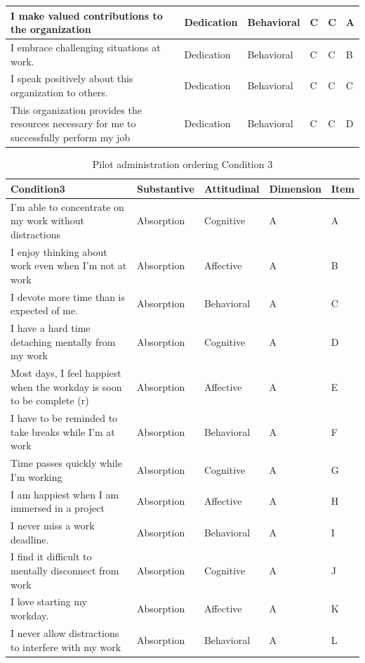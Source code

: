 \documentclass[
]{book}
\begin{document}
\begin{table}
\begin{tabular}[t]{l|l|l|l|l|l}
\hline
I make valued contributions to the organization & Dedication & Behavioral & C & C & A\\
\hline
I embrace challenging situations at work. & Dedication & Behavioral & C & C & B\\
\hline
I speak positively about this organization to others. & Dedication & Behavioral & C & C & C\\
\hline
This organization provides the resources necessary for me to successfully perform my job & Dedication & Behavioral & C & C & D\\
\hline
\end{tabular}
\end{table}

\begin{table}

\caption{\label{tab:cond3}Pilot administration ordering Condition 3}
\centering
\begin{tabular}[t]{l|l|l|l|l}
\hline
Condition3 & Substantive & Attitudinal & Dimension & Item\\
\hline
I’m able to concentrate on my work without distractions & Absorption & Cognitive & A & A\\
\hline
I enjoy thinking about work even when I’m not at work & Absorption & Affective & A & B\\
\hline
I devote more time than is expected of me. & Absorption & Behavioral & A & C\\
\hline
I have a hard time detaching mentally from my work & Absorption & Cognitive & A & D\\
\hline
Most days, I feel happiest when the workday is soon to be complete (r) & Absorption & Affective & A & E\\
\hline
I have to be reminded to take breaks while I’m at work & Absorption & Behavioral & A & F\\
\hline
Time passes quickly while I’m working & Absorption & Cognitive & A & G\\
\hline
I am happiest when I am immersed in a project & Absorption & Affective & A & H\\
\hline
I never miss a work deadline. & Absorption & Behavioral & A & I\\
\hline
I find it difficult to mentally disconnect from work & Absorption & Cognitive & A & J\\
\hline
I love starting my workday. & Absorption & Affective & A & K\\
\hline
I never allow distractions to interfere with my work & Absorption & Behavioral & A & L\\

\end{tabular}
\end{table}
\end{document}
